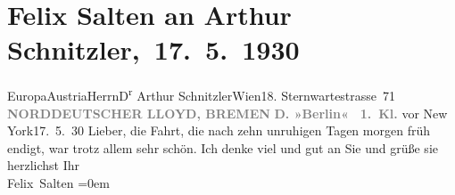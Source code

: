 

         
         \renewcommand{\erwaehntePersonen}{Personen: Felix Salten}
         \renewcommand{\erwaehnteInstitutionen}{Institutionen: Dampfer Berlin, Deutsch-amerikanische Seepost, Norddeutscher Lloyd}
         \renewcommand{\erwaehnteOrte}{Orte: Atlantischer Ozean, Bremen, Europa, New York City, Sternwartestraße 71, Wien, Österreich}
         \renewcommand{\erwaehnteWerke}{}
               \section[ Felix Salten an Arthur Schnitzler, 17. 5. 1930]{ Felix Salten an Arthur Schnitzler, 17. 5. 1930}\nopagebreak{}\rehead{ }\begin{ledgroupsized}[t]{13cm}\normalsize\beginnumbering{} \toendnotes[C]{\smallbreak\pagebreak[2]} 
\toendnotes[C]{\smallbreak}\pstart{}{\pb}Europa\pend{}\pstart{}Austria\pend{}\pstart{}Herrn\pend{}\pstart{}D\textsuperscript{r} Arthur Schnitzler\pend{}\pstart{}Wien\pend{}\pstart{}18. Sternwartestrasse 71\pend{}{\bigskip}\pstart
           \noindent{}\centering{}{\pb}\textcolor{gray}{\textbf{NORDDEUTSCHER LLOYD, BREMEN}}\pend
           \pstart
           \noindent{}\centering{}\textcolor{gray}{\textbf{D. »Berlin«}}\pend
           \pstart
           \noindent{}\centering{}\textcolor{gray}{\textbf{\label{T_L03533-1v}\label{T_L03533-1h} 1. Kl.}}\pend
           \pstart
           \raggedleft{}{\pb}vor New York17. 5. 30\pend
           \pstart
           Lieber, die Fahrt, die nach zehn unruhigen Tagen morgen{ }früh endigt, war trotz allem sehr schön. Ich denke viel und gut an Sie
               und grüße sie herzlichst\pend
           \pstart
           Ihr {\\[\baselineskip]}\spacefill\mbox{Felix Salten}\pend
           \leftskip=0em{}
         
         \endnumbering{}\end{ledgroupsized}  \newcommand{\dateiname}{L03533}\newcommand{\titel}{Felix Salten an Arthur Schnitzler, 17. 5. 1930}\newcommand{\editorInnen}{Martin Anton Müller und Laura Untner}
      